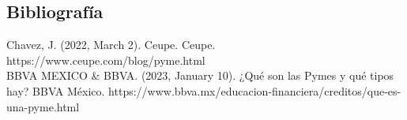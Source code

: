 \documentclass[letterpaper,12pt]{article}
\begin{document}
\begin{sloppypar}
\subsection{Bibliografía}
Chavez, J. (2022, March 2). Ceupe. Ceupe. https://www.ceupe.com/blog/pyme.html
\vspace{0.3cm}\\ 
BBVA MEXICO \& BBVA. (2023, January 10). ¿Qué son las Pymes y qué tipos hay? BBVA México. https://www.bbva.mx/educacion-financiera/creditos/que-es-una-pyme.html

\end{sloppypar}
\end{document}

